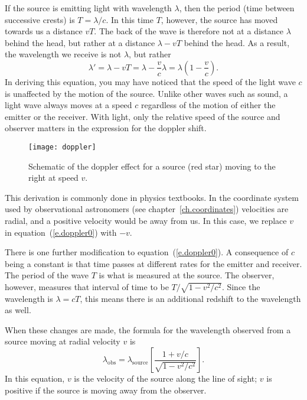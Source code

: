 If the source is emitting light with wavelength $\lambda$, then the period (time between successive crests) is $T = \lambda/c$.  In this time $T$, however, the source has moved towards us a distance $vT$. The back of the wave is therefore not at a distance $\lambda$ behind the head, but rather at a distance $\lambda - vT$ behind the head.  As a result, the wavelength we receive is not $\lambda$, but rather
\begin{equation}\label{e.doppler0}
 \lambda' = \lambda - vT = \lambda - \frac{v}{c}\lambda = \lambda\left(1-\frac{v}{c}\right).
\end{equation}
In deriving this equation, you may have noticed that the speed of the light wave $c$ is unaffected by the motion of the source.  Unlike other waves such as sound, a light wave always moves at a speed $c$ regardless of the motion of either the emitter or the receiver. With light, only the relative speed of the source and observer matters in the expression for the doppler shift.

\begin{figure*}
\texttt{[image: doppler]}
\caption[Schematic of the doppler effect]{Schematic of the doppler effect for a source (red star) moving to the right at speed $v$.}
\label{f.doppler}
\end{figure*}

This derivation is commonly done in physics textbooks. In the coordinate system used by observational astronomers (see chapter~\ref{ch.coordinates}) velocities are radial, and a positive velocity would be away from us. In this case, we replace $v$ in equation~(\ref{e.doppler0}) with $-v$.  

There is one further modification to equation~(\ref{e.doppler0}).
A consequence of $c$ being a constant is that time passes at different rates for the emitter and receiver.  The period of the wave $T$ is what is measured at the source.  The observer, however, measures that interval of time to be $T/\sqrt{1-v^{2}/c^{2}}$.  Since the wavelength is $\lambda = cT$, this means there is an additional redshift to the wavelength as well.

When these changes are made, the formula for the wavelength observed from a source moving at radial velocity $v$ is
\begin{equation}\label{e.doppler}
\lambda_{\mathrm{obs}} 
 = \lambda_{\mathrm{source}} \left[\frac{1+v/c}{\sqrt{1-v^{2}/c^{2}}}\right].
\end{equation}
In this equation, $v$ is the velocity of the source along the line of sight; $v$ is positive if the source is moving away from the observer.

